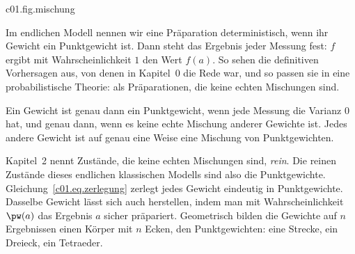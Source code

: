 \begin{tpcfigure}{c01.fig.mischung}
  \caption{Die Konstruktion aus Gleichung~\eqref{c01.eq.echte-mischung} für den gezinkten
    Würfel $\pw$ aus Gleichung~\eqref{c01.eq.gezinkt}, mit $a = 6$, $b = 1$ und
    $\varepsilon = \tfrac{1}{12}$. Von $\pw$ aus (links) wird das Gewicht $\tfrac{1}{12}$
    einmal von $1$ nach $6$ verschoben (Mitte, $q$) und einmal von $6$ nach $1$ (rechts,
    $r$); die veränderten Balken sind schraffiert. Hier ist $r$ der faire Würfel. Der gezinkte Würfel
    ist die Mischung $\pw = \tfrac12 q + \tfrac12 r$ und deshalb kein Punktgewicht.}
\end{tpcfigure}

Im endlichen Modell nennen wir eine Präparation deterministisch, wenn ihr Gewicht ein
Punktgewicht ist. Dann steht das Ergebnis jeder Messung fest: $f$ ergibt mit
Wahrscheinlichkeit $1$ den Wert $f(a)$. So sehen die definitiven Vorhersagen aus, von denen
in Kapitel~0 die Rede war, und so passen sie in eine probabilistische Theorie: als
Präparationen, die keine echten Mischungen sind.

\begin{merksatz}[Merksatz]
  Ein Gewicht ist genau dann ein Punktgewicht, wenn jede Messung die Varianz $0$ hat, und
  genau dann, wenn es keine echte Mischung anderer Gewichte ist. Jedes andere Gewicht ist
  auf genau eine Weise eine Mischung von Punktgewichten.
\end{merksatz}

Kapitel~2 nennt Zustände, die keine echten Mischungen sind, \emph{rein}. Die reinen
Zustände dieses endlichen klassischen Modells sind also die Punktgewichte.
Gleichung~\eqref{c01.eq.zerlegung} zerlegt jedes Gewicht eindeutig in Punktgewichte.
Dasselbe Gewicht lässt sich auch herstellen, indem man mit Wahrscheinlichkeit $\pw(a)$ das
Ergebnis $a$ sicher präpariert.
Geometrisch bilden die Gewichte auf $n$ Ergebnissen einen Körper mit $n$ Ecken, den
Punktgewichten: eine Strecke, ein Dreieck, ein Tetraeder.

